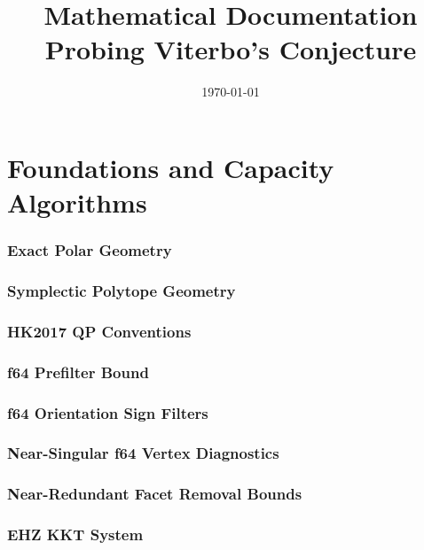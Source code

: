 \documentclass{article}
\title{Mathematical Documentation\\[0.5em]
  \large Probing Viterbo's Conjecture}
\author{}
\date{\today}
\begin{document}
\maketitle
\tableofcontents
\newpage

\part{Foundations and Capacity Algorithms}

\section{Exact Polar Geometry}


\section{Symplectic Polytope Geometry}


\section{HK2017 QP Conventions}


\section{f64 Prefilter Bound}


\section{f64 Orientation Sign Filters}


\section{Near-Singular f64 Vertex Diagnostics}


\section{Near-Redundant Facet Removal Bounds}


\section{EHZ KKT System}

\end{document}
